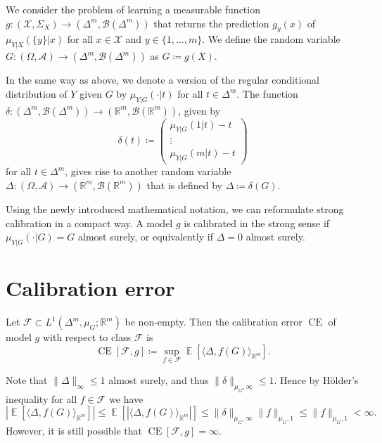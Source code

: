 \documentclass{article}
\DeclareMathOperator{\Expect}{\mathbb{E}}
\DeclareMathOperator{\measure}{CE}
\begin{document}
We consider the problem of learning a measurable function
$g \colon (\mathcal{X}, \Sigma_X) \to (\Delta^m, \mathcal{B}(\Delta^m))$ that
returns the prediction $g_y(x)$ of $\mu_{Y|X}(\{y\}|x)$ for all $x \in \mathcal{X}$
and $y \in \{1,\ldots,m\}$. We define the random variable
$G \colon (\Omega, \mathcal{A}) \to (\Delta^m, \mathcal{B}(\Delta^m))$ as $G \coloneqq g(X)$.

In the same way as above, we denote a version of the regular conditional
distribution of $Y$ given $G$ by $\mu_{Y|G}(\cdot|t)$ for all $t \in \Delta^m$.
The function
$\delta \colon (\Delta^m, \mathcal{B}(\Delta^m)) \to (\mathbb{R}^m, \mathcal{B}(\mathbb{R}^m))$,
given by
\begin{equation*}
  \delta(t) \coloneqq \begin{pmatrix}
    \mu_{Y|G}(1|t) - t \\
    \vdots \\
    \mu_{Y|G}(m|t) - t
  \end{pmatrix}
\end{equation*}
for all $t \in \Delta^m$, gives rise to another random variable
$\Delta \colon (\Omega, \mathcal{A}) \to (\mathbb{R}^m, \mathcal{B}(\mathbb{R}^m))$
that is defined by $\Delta \coloneqq \delta(G)$.

Using the newly introduced mathematical notation, we can reformulate strong
calibration in a compact way. A model $g$ is calibrated in the strong sense if
$\mu_{Y|G}(\cdot|G) = G$ almost surely, or equivalently if $\Delta = 0$ almost surely.

\section{Calibration error}

\begin{definition}
  Let $\mathcal{F} \subset L^1(\Delta^m, \mu_G; \mathbb{R}^m)$ be non-empty.
  Then the calibration error $\measure$ of model $g$ with respect to class
  $\mathcal{F}$ is
  \begin{equation*}
    \measure[\mathcal{F}, g]  \coloneqq \sup_{f \in \mathcal{F}} \Expect\left[\langle \Delta, f(G) \rangle_{\mathbb{R}^m}\right].
  \end{equation*}
\end{definition}

\begin{remark}\label{remark:exists}
  Note that $\|\Delta\|_{\infty} \leq 1$ almost surely, and thus
  $\|\delta\|_{\mu_G,\infty} \leq 1$. Hence by Hölder's inequality for all
  $f \in \mathcal{F}$ we have
  \begin{equation*}
    |\Expect[\langle \Delta, f(G) \rangle_{\mathbb{R}^m}]| \leq \Expect[|\langle \Delta, f(G) \rangle_{\mathbb{R}^m}|] \leq \|\delta\|_{\mu_G,\infty} \|f\|_{\mu_G,1} \leq \|f\|_{\mu_G,1} < \infty.
  \end{equation*}
  However, it is still possible that $\measure[\mathcal{F}, g] = \infty$.
\end{remark}
\end{document}

